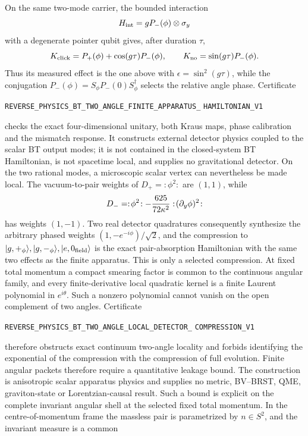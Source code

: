 \documentclass[11pt]{article}
\theoremstyle{definition}
\theoremstyle{remark}
\begin{document}
On the same two-mode carrier, the bounded interaction
\[
 H_{\rm int}=gP_-(\phi)\otimes\sigma_y
\]
with a degenerate pointer qubit gives, after duration $\tau$,
\[
 K_{\rm click}=P_+(\phi)+\cos(g\tau)P_-(\phi),\qquad
 K_{\rm no}=\sin(g\tau)P_-(\phi).
\]
Thus its measured effect is the one above with
$\epsilon=\sin^2(g\tau)$, while the conjugation
$P_-(\phi)=S_\phi P_-(0)S_\phi^\dagger$ selects the relative angle phase.
Certificate
\par\noindent
\texttt{REVERSE\_PHYSICS\_BT\_TWO\_ANGLE\_FINITE\_APPARATUS\_}
\allowbreak\texttt{HAMILTONIAN\_V1}
\par\noindent
checks the exact four-dimensional unitary, both Kraus maps, phase calibration
and the mismatch response.  It constructs external detector physics coupled
to the scalar BT output modes; it is not contained in the closed-system BT
Hamiltonian, is not spacetime local, and supplies no gravitational detector.
On the two rational modes, a microscopic scalar vertex can nevertheless be
made local.  The vacuum-to-pair weights of
$D_+=:\!\phi^2\!:$ are $(1,1)$, while
\[
 D_-=:\!\phi^2\!:
 -{625\over72\kappa^2}:\!(\partial_y\phi)^2\!:
\]
has weights $(1,-1)$.  Two real detector quadratures consequently synthesize
the arbitrary phased weights $(1,-e^{-i\phi})/\sqrt2$, and the compression to
$|g,+_\phi\rangle,|g,-_\phi\rangle,|e,0_{\rm field}\rangle$ is the exact
pair-absorption Hamiltonian with the same two effects as the finite apparatus.
This is only a selected compression.  At fixed total momentum a compact
smearing factor is common to the continuous angular family, and every
finite-derivative local quadratic kernel is a finite Laurent polynomial in
$e^{i\theta}$.  Such a nonzero polynomial cannot vanish on the open
complement of two angles.  Certificate
\par\noindent
\texttt{REVERSE\_PHYSICS\_BT\_TWO\_ANGLE\_LOCAL\_DETECTOR\_}
\allowbreak\texttt{COMPRESSION\_V1}
\par\noindent
therefore obstructs exact continuum two-angle locality and forbids identifying
the exponential of the compression with the compression of full evolution.
Finite angular packets therefore require a quantitative leakage bound.  The construction
is anisotropic scalar apparatus physics and supplies no metric, BV--BRST,
QME, graviton-state or Lorentzian-causal result.
Such a bound is explicit on the complete invariant angular shell at the
selected fixed total momentum.  In the centre-of-momentum frame the massless
pair is parametrized by $n\in S^2$, and the invariant measure is a common
\end{document}
